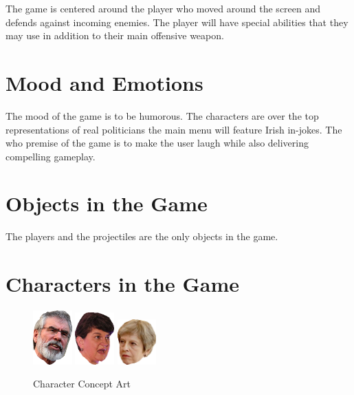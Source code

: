 \documentclass[a4paper]{scrreprt}
\begin{document}
    The game is centered around the player who moved around the screen and defends against incoming enemies.
    The player will have special abilities that they may use in addition to their main offensive weapon.

    \section{Mood and Emotions}

    The mood of the game is to be humorous.
    The characters are over the top representations of real politicians the main menu will feature Irish in-jokes.
    The who premise of the game is to make the user laugh while also delivering compelling gameplay.

    \section{Objects in the Game}

    The players and the projectiles are the only objects in the game.

    \section{Characters in the Game}

    \begin{figure}[H]
        \begin{addmargin}[13.5em]{0em}
            \includegraphics[width=1.5cm]{gerry-right}
            \includegraphics[width=1.5cm]{arlene}
            \includegraphics[width=1.5cm]{tess}
        \end{addmargin}
        \caption{\label{fig:art} Character Concept Art}
    \end{figure}
\end{document}
